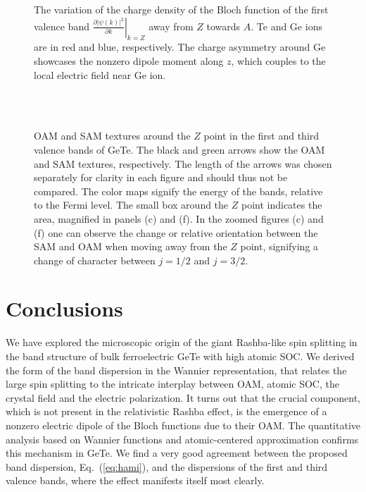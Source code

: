 \begin{figure}
\caption{\label{Fig:diffdens}The variation of the charge density of the Bloch function of the first valence band $\left.\frac{\partial |\psi(k)|^2}{\partial k}\right\rvert_{k=Z}$ away from $Z$ towards $A$. Te and Ge ions are in red and blue, respectively. The charge asymmetry around Ge showcases the nonzero dipole moment along $z$, which couples to the local electric field near Ge ion.}
\end{figure}
\begin{figure*}[t!]
  ~
  ~
  \\
  ~
  ~
  ~
  \caption{\label{fig:Rashba_textures} OAM and SAM textures around the $Z$ point in the first and third valence bands of GeTe. The black and green arrows show the OAM and SAM textures, respectively. The length of the arrows was chosen separately for clarity in each figure and should thus not be compared. The color maps signify the energy of the bands, relative to the Fermi level. The small box around the $Z$ point indicates the area, magnified in panels (c) and (f). In the zoomed figures (c) and (f) one can observe the change or relative orientation between the SAM and OAM when moving away from the $Z$ point, signifying a change of character between $j=1/2$ and $j=3/2$.}
\end{figure*}

\section{Conclusions}

We have explored the microscopic origin of the giant Rashba-like spin splitting in the band structure of bulk ferroelectric GeTe with high atomic SOC. We derived the form of the band dispersion in the Wannier representation, that relates the large spin splitting to the intricate interplay between OAM, atomic SOC, the crystal field and the electric polarization. It turns out that the crucial component, which is not present in the relativistic Rashba effect, is the emergence of a nonzero electric dipole of the Bloch functions due to their OAM. The quantitative analysis based on Wannier functions and atomic-centered approximation confirms this mechanism in GeTe. We find a very good agreement between the proposed band dispersion, Eq.~(\ref{eq:hami}), and the dispersions of the first and third valence bands, where the effect manifests itself most clearly.


